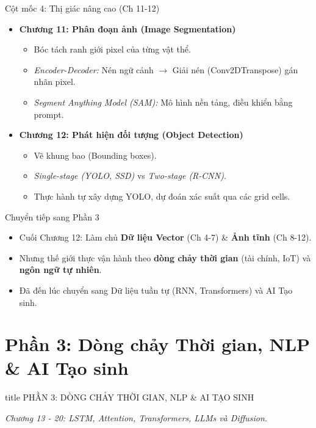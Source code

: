\documentclass[aspectratio=169]{beamer}
\begin{document}
\begin{frame}{Cột mốc 4: Thị giác nâng cao (Ch 11-12)}
    \begin{itemize}
        \item \textbf{Chương 11: Phân đoạn ảnh (Image Segmentation)}
        \begin{itemize}
            \item Bóc tách ranh giới pixel của từng vật thể.
            \item \textit{Encoder-Decoder:} Nén ngữ cảnh $\rightarrow$ Giải nén (Conv2DTranspose) gán nhãn pixel.
            \item \textit{Segment Anything Model (SAM):} Mô hình nền tảng, điều khiển bằng prompt.
        \end{itemize}
        \item \textbf{Chương 12: Phát hiện đối tượng (Object Detection)}
        \begin{itemize}
            \item Vẽ khung bao (Bounding boxes).
            \item \textit{Single-stage (YOLO, SSD)} vs \textit{Two-stage (R-CNN)}.
            \item Thực hành tự xây dựng YOLO, dự đoán xác suất qua các grid cells.
        \end{itemize}
    \end{itemize}
\end{frame}

\begin{frame}{Chuyển tiếp sang Phần 3}
    \begin{itemize}
        \item Cuối Chương 12: Làm chủ \textbf{Dữ liệu Vector} (Ch 4-7) \& \textbf{Ảnh tĩnh} (Ch 8-12).
        \item Nhưng thế giới thực vận hành theo \textbf{dòng chảy thời gian} (tài chính, IoT) và \textbf{ngôn ngữ tự nhiên}.
        \item Đã đến lúc chuyển sang Dữ liệu tuần tự (RNN, Transformers) và AI Tạo sinh.
    \end{itemize}
\end{frame}

\section{Phần 3: Dòng chảy Thời gian, NLP \& AI Tạo sinh}

\begin{frame}
    \vfill
    \centering
    \begin{beamercolorbox}[sep=8pt,center,shadow=true,rounded=true]{title}
        \Large PHẦN 3: DÒNG CHẢY THỜI GIAN, NLP \& AI TẠO SINH
    \end{beamercolorbox}
    \vspace{0.5cm}
    \textit{Chương 13 - 20: LSTM, Attention, Transformers, LLMs và Diffusion.}
    \vfill
\end{frame}
\end{document}
